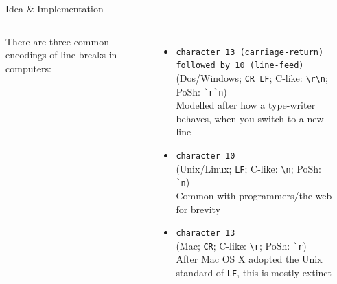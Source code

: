 \documentclass[english,aspectratio=169,handout]{beamer}
\begin{document}
\begin{frame}{Idea \& Implementation}
\begin{columns}
        There are three common encodings of line breaks in computers:
        \begin{itemize}
            \item \texttt{character 13 (carriage-return) followed by 10 (line-feed)}\\
            \smallskip\scriptsize(Dos/Windows; \texttt{CR LF}; C-like: \texttt{\textbackslash{}r\textbackslash{}n}; PoSh: \texttt{\`{}r\`{}n})\\
            \normalsize{}Modelled after how a type-writer behaves, when you switch to a new line
            \item \texttt{character 10}\\
            \smallskip\scriptsize(Unix/Linux; \texttt{LF}; C-like: \texttt{\textbackslash{}n}; PoSh: \texttt{\`{}n})\\
            \normalsize{}Common with programmers/the web for brevity
            \item \texttt{character 13}\\
            \smallskip\scriptsize(Mac; \texttt{CR}; C-like: \texttt{\textbackslash{}r}; PoSh: \texttt{\`{}r})\\
            \normalsize{}After Mac OS X adopted the Unix standard of \texttt{LF}, this is mostly extinct
        \end{itemize}
        \begin{center}
        \end{center}
    \end{columns}
\end{frame}
\end{document}
